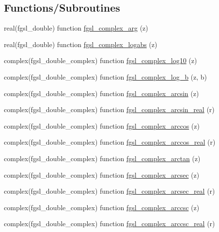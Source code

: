 \subsection*{Functions/\+Subroutines}
\begin{DoxyCompactItemize}
\item 
real(fgsl\+\_\+double) function \hyperlink{complex_8finc_a0b57597099e0abb1250c833a4e9bff77}{fgsl\+\_\+complex\+\_\+arg} (z)
\item 
real(fgsl\+\_\+double) function \hyperlink{complex_8finc_a42cb53d8f58e2ded216785a6884e761f}{fgsl\+\_\+complex\+\_\+logabs} (z)
\item 
complex(fgsl\+\_\+double\+\_\+complex) function \hyperlink{complex_8finc_ae9fc7b48e2331e3866c163ac2e8df9af}{fgsl\+\_\+complex\+\_\+log10} (z)
\item 
complex(fgsl\+\_\+double\+\_\+complex) function \hyperlink{complex_8finc_aa06abfcf4cf0160771747d99a30a6640}{fgsl\+\_\+complex\+\_\+log\+\_\+b} (z, b)
\item 
complex(fgsl\+\_\+double\+\_\+complex) function \hyperlink{complex_8finc_ae2a77be34dc8a65a8d85e5f0ee6e2629}{fgsl\+\_\+complex\+\_\+arcsin} (z)
\item 
complex(fgsl\+\_\+double\+\_\+complex) function \hyperlink{complex_8finc_a0d5f1fa6698c94d6506f1e34603e3d18}{fgsl\+\_\+complex\+\_\+arcsin\+\_\+real} (r)
\item 
complex(fgsl\+\_\+double\+\_\+complex) function \hyperlink{complex_8finc_a483b6501e53d69ff81aa184a60647d6f}{fgsl\+\_\+complex\+\_\+arccos} (z)
\item 
complex(fgsl\+\_\+double\+\_\+complex) function \hyperlink{complex_8finc_acf733006095db0ebc0b99ea36c171438}{fgsl\+\_\+complex\+\_\+arccos\+\_\+real} (r)
\item 
complex(fgsl\+\_\+double\+\_\+complex) function \hyperlink{complex_8finc_a8ee7c4c57b7f61614bfb1372f072e36d}{fgsl\+\_\+complex\+\_\+arctan} (z)
\item 
complex(fgsl\+\_\+double\+\_\+complex) function \hyperlink{complex_8finc_a14d3bb9bb647ba302d97f4cb5ef39f99}{fgsl\+\_\+complex\+\_\+arcsec} (z)
\item 
complex(fgsl\+\_\+double\+\_\+complex) function \hyperlink{complex_8finc_ad420c933fcc07872208823e44c965190}{fgsl\+\_\+complex\+\_\+arcsec\+\_\+real} (r)
\item 
complex(fgsl\+\_\+double\+\_\+complex) function \hyperlink{complex_8finc_ac438eff3b3caed126ae6c7929592f750}{fgsl\+\_\+complex\+\_\+arccsc} (z)
\item 
complex(fgsl\+\_\+double\+\_\+complex) function \hyperlink{complex_8finc_ac5b418b5127b93cddea551723a955143}{fgsl\+\_\+complex\+\_\+arccsc\+\_\+real} (r)

\end{DoxyCompactItemize}
